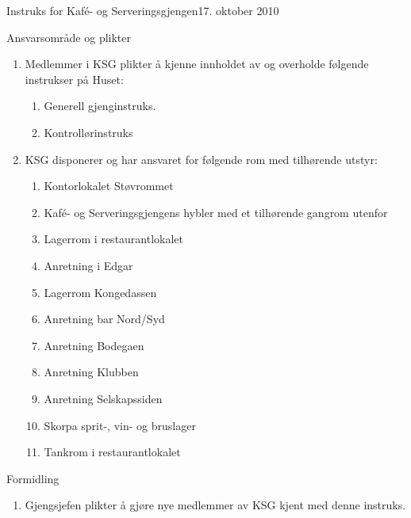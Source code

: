 \begin{instruks}{Instruks for Kafé- og Serveringsgjengen}{17. oktober 2010}{ }
    \begin{instruksledd}{Ansvarsområde og plikter}
        \begin{enumerate}
            \item  Medlemmer i KSG plikter å kjenne innholdet av og overholde følgende instrukser på
                Huset:
                \begin{enumerate}
                    \item Generell gjenginstruks.
                    \item Kontrollørinstruks
                \end{enumerate}
            \item KSG disponerer og har ansvaret for følgende rom med tilhørende utstyr:
                \begin{enumerate}
                    \item Kontorlokalet Støvrommet
                    \item Kafé- og Serveringsgjengens hybler med et tilhørende gangrom utenfor
                    \item Lagerrom i restaurantlokalet
                    \item Anretning i Edgar
                    \item Lagerrom Kongedassen
                    \item Anretning bar Nord/Syd
                    \item Anretning Bodegaen
                    \item Anretning Klubben
                    \item Anretning Selskapssiden
                    \item Skorpa sprit-, vin- og bruslager
                    \item Tankrom i restaurantlokalet
                \end{enumerate}
        \end{enumerate}
    \end{instruksledd}

    \begin{instruksledd}{Formidling}
        \begin{enumerate}
            \item Gjengsjefen plikter å gjøre nye medlemmer av KSG kjent med denne instruks.
        \end{enumerate}
    \end{instruksledd}

\end{instruks}


